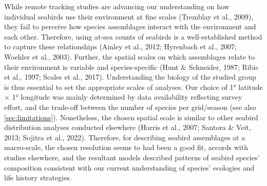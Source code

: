 \documentclass{article}
\begin{document}
\begin{linenumbers}
While remote tracking studies are advancing our understanding on how individual seabirds use their environment at fine scales (Tremblay et al., 2009), they fail to perceive how species assemblages interact with the environment and each other. Therefore, using at-sea counts of seabirds is a well-established method to capture these relationships (Ainley et al., 2012; Hyrenbach et al., 2007; Woehler et al., 2003). Further, the spatial scales on which assemblages relate to their environment is variable and species-specific (Hunt \& Schneider, 1987; Ribic et al., 1997; Scales et al., 2017). Understanding the biology of the studied group is thus essential to set the appropriate scales of analyses. Our choice of 1° latitude \(\times\) 1° longitude was mainly determined by data availability reflecting survey effort, and the trade-off between the number of species per grid/season (see also \ref{sec:limitations}). Nonetheless, the chosen spatial scale is similar to other seabird distribution analyses conducted elsewhere (Harris et al., 2007; Santora \& Veit, 2013; Sojitra et al., 2022). Therefore, for describing seabird assemblages at a macro-scale, the chosen resolution seems to had been a good fit, accords with studies elsewhere, and the resultant models described patterns of seabird species' composition consistent with our current understanding of species' ecologies and life history strategies.


\end{linenumbers}
\end{document}
